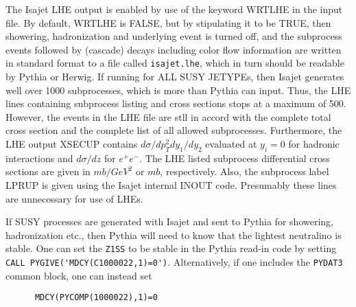 The Isajet LHE output is enabled by use of the keyword WRTLHE in the 
input file. By default, WRTLHE is FALSE, but by stipulating it to be TRUE,
then showering, hadronization and underlying event is turned off, 
and the subprocess events followed by (cascade) decays 
including color flow information are written in standard format to a 
file called \verb|isajet.lhe|, which in turn should be readable by Pythia 
or Herwig.
If running for ALL SUSY JETYPEs, then Isajet generates well over 1000
subprocesses, which is more than Pythia can input. Thus, the LHE lines 
containing subprocess listing and cross sections stops at a maximum of 500.
However, the events in the LHE file are stll in accord with the complete
total cross section and the complete list of all allowed subprocesses.
Furthermore, the LHE output XSECUP contains $d\sigma /dp_T^2dy_1/dy_2$
evaluated at $y_i=0$ for hadronic interactions and $d\sigma /dz$ for
$e^+e^-$. The LHE listed subprocess differential cross sections are given in $mb/GeV^2$ or $mb$, 
respectively. Also, the subprocess label
LPRUP is given using the Isajet internal INOUT code.
Presumably these lines are unnecessary for use of LHEs.

If SUSY processes are generated with Isajet and sent to Pythia 
for showering, hadronization etc., then Pythia will need to know 
that the lightest neutralino is stable. One can set the \verb|Z1SS|
to be stable in the Pythia read-in code by setting
\verb|CALL PYGIVE('MDCY(C1000022,1)=0')|. 
Alternatively, if one includes the
\verb|PYDAT3| common block, one can instead set 
\begin{verbatim}
      MDCY(PYCOMP(1000022),1)=0 
\end{verbatim}

